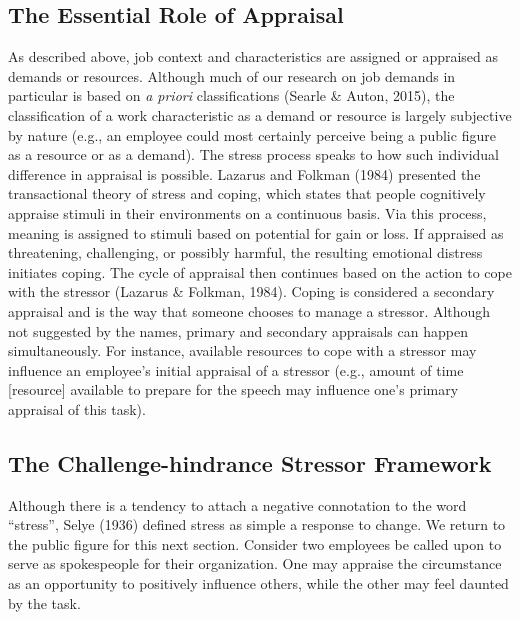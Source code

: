 \documentclass[
  man,mask]{apa6}
\begin{document}
\hypertarget{the-essential-role-of-appraisal}{%
\subsection{The Essential Role of Appraisal}\label{the-essential-role-of-appraisal}}

As described above, job context and characteristics are assigned or appraised as demands or resources. Although much of our research on job demands in particular is based on \emph{a priori} classifications (Searle \& Auton, 2015), the classification of a work characteristic as a demand or resource is largely subjective by nature (e.g., an employee could most certainly perceive being a public figure as a resource or as a demand). The stress process speaks to how such individual difference in appraisal is possible. Lazarus and Folkman (1984) presented the transactional theory of stress and coping, which states that people cognitively appraise stimuli in their environments on a continuous basis. Via this process, meaning is assigned to stimuli based on potential for gain or loss. If appraised as threatening, challenging, or possibly harmful, the resulting emotional distress initiates coping. The cycle of appraisal then continues based on the action to cope with the stressor (Lazarus \& Folkman, 1984). Coping is considered a secondary appraisal and is the way that someone chooses to manage a stressor. Although not suggested by the names, primary and secondary appraisals can happen simultaneously. For instance, available resources to cope with a stressor may influence an employee's initial appraisal of a stressor (e.g., amount of time {[}resource{]} available to prepare for the speech may influence one's primary appraisal of this task).

\hypertarget{the-challenge-hindrance-stressor-framework}{%
\subsection{The Challenge-hindrance Stressor Framework}\label{the-challenge-hindrance-stressor-framework}}

Although there is a tendency to attach a negative connotation to the word ``stress'', Selye (1936) defined stress as simple a response to change. We return to the public figure for this next section. Consider two employees be called upon to serve as spokespeople for their organization. One may appraise the circumstance as an opportunity to positively influence others, while the other may feel daunted by the task.
\end{document}
